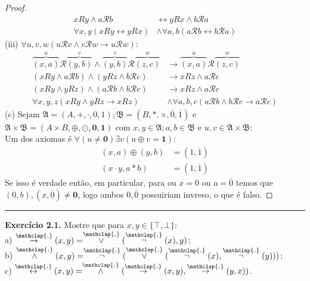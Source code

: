 \documentclass[11pt]{article}
\theoremstyle{definition}
\newcommand{\sse}{\leftrightarrow}
\newcommand{\mc}[1]{\mathcal{#1}}
\newcommand{\mf}[1]{\mathfrak{#1}}
\newcommand{\ol}[1]{\overline{#1}}
\newcommand\overtext[2]{\stackrel{\mathclap{\normalfont\mbox{#1}}}{#2}}
\begin{document}
\begin{proof}
\begin{align*}
    xRy\wedge a\mc{R}b & \sse yRx\wedge b\mc{R}a\\
    \forall x,y(xRy\sse yRx) & \wedge \forall a,b(a\mc{R}b\sse b\mc{R}a)
\end{align*}
(iii) $\forall u,v,w(u\mathscr{R} v\wedge v\mathscr{R} w\to u\mathscr{R}w)$:
\begin{align*}
    \overbrace{(x,a)}^u\mathscr{R}\overbrace{(y,b)}^v\wedge \overbrace{(y,b)}^v\mathscr{R}\overbrace{(z,c)}^w & \to \overbrace{(x,a)}^u\mathscr{R}\overbrace{(z,c)}^w\\
    (xRy\wedge a\mc{R}b)\wedge(yRz\wedge b\mc{R}c) & \to xRz\wedge a\mc{R}c\\
    (xRy\wedge yRz)\wedge(a\mc{R}b\wedge b\mc{R}c) & \to xRz\wedge a\mc{R}c\\
    \forall x,y,z(xRy\wedge yRz\to xRz) & \wedge\forall a,b,c(a\mc{R}b\wedge b\mc{R}c\to a\mc{R}c)
\end{align*}
(c) Sejam $\mf{A}=(A,+,\cdot,0,1);\mf{B}=(B,*,\times,\ol{0},\ol{1})$ e $\mf{A}\times\mf{B}=(A\times B,\oplus,\odot,\mathbf{0},\mathbf{1})$ com $x,y\in\mf{A};a,b\in\mf{B}$ e $u,v\in\mf{A}\times\mf{B}$:\\
Um dos axiomas é $\forall(u\ne\mathbf{0})\exists v(u\oplus v=\mathbf{1})$:
\begin{align*}
    (x,a)\oplus(y,b) & =(1,\ol{1})\\
    (x\cdot y,a*b) & = (1,\ol{1})
\end{align*}
Se isso é verdade então, em particular, para ou $x=0$ ou $a=\ol{0}$ temos que $(0,b),(x,\ol{0})\ne\mathbf{0}$, logo ambos $0,\ol{0}$ possuiriam invreso, o que é falso.
\end{proof}

\hrule

\textbf{Exercício 2.1.} Mostre que para $x,y\in\{\top,\bot\}$:\\
a) $\overtext{.}{\to}(x,y)=\overtext{.}{\vee}(\overtext{.}{\neg}(x),y)$;\\
b) $\overtext{.}{\wedge}(x,y)=\overtext{.}{\neg}(\overtext{.}{\vee}(\overtext{.}{\neg}(x),\overtext{.}{\neg}(y)))$;\\
c) $\overtext{.}{\leftrightarrow}(x,y)=\overtext{.}{\wedge}(\overtext{.}{\to}(x,y),\overtext{.}{\to}(y,x))$.
\end{document}
